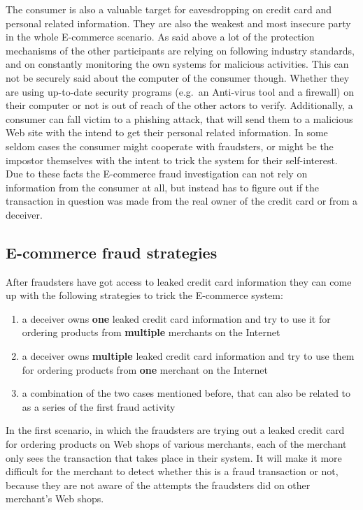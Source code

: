The consumer is also a valuable target for eavesdropping on credit card and personal related information. They are also the weakest and most insecure party in the whole E-commerce scenario. As said above a lot of the protection mechanisms of the other participants are relying on following industry standards, and on constantly monitoring the own systems for malicious activities. This can not be securely said about the computer of the consumer though. Whether they are using up-to-date security programs (e.g.\ an Anti-virus tool and a firewall) on their computer or not is out of reach of the other actors to verify. Additionally, a consumer can fall victim to a phishing attack, that will send them to a malicious Web site with the intend to get their personal related information. In some seldom cases the consumer might cooperate with fraudsters, or might be the impostor themselves with the intent to trick the system for their self-interest. Due to these facts the \gls{E-commerce} fraud investigation can not rely on information from the consumer at all, but instead has to figure out if the transaction in question was made from the real owner of the credit card or from a deceiver.


\subsection{E-commerce fraud strategies}
\label{subsec:strategies_fraudster}

After fraudsters have got access to leaked credit card information they can come up with the following strategies to trick the \gls{E-commerce} system:\@

\begin{enumerate}
  \item a deceiver owns \textbf{one} leaked credit card information and try to use it for ordering products from \textbf{multiple} merchants on the Internet
  \item a deceiver owns \textbf{multiple} leaked credit card information and try to use them for ordering products from \textbf{one} merchant on the Internet
  \item a combination of the two cases mentioned before, that can also be related to as a series of the first fraud activity
\end{enumerate}

In the first scenario, in which the fraudsters are trying out a leaked credit card for ordering products on Web shops of various merchants, each of the merchant only sees the transaction that takes place in their system. It will make it more difficult for the merchant to detect whether this is a fraud transaction or not, because they are not aware of the attempts the fraudsters did on other merchant's Web shops. \\


